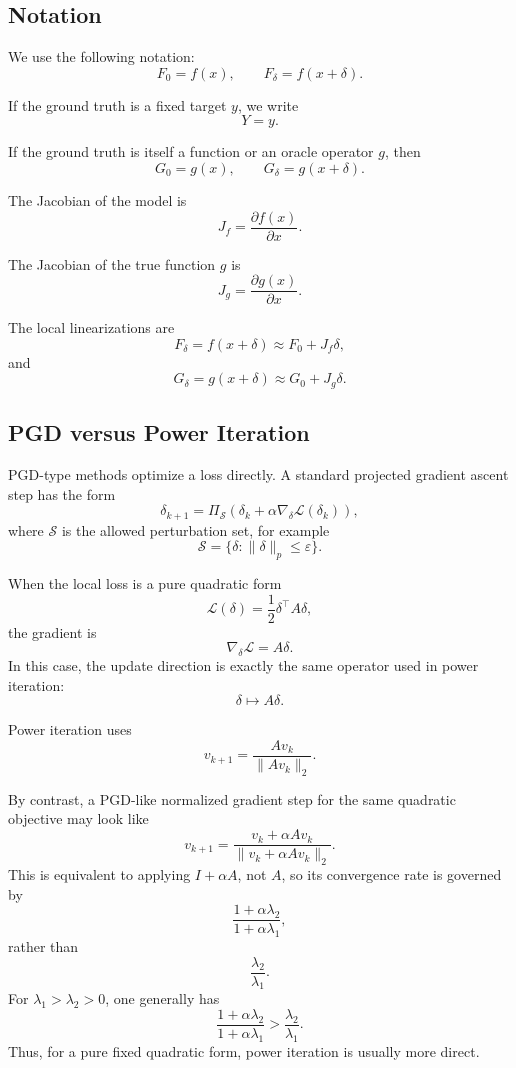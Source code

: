 \documentclass{article}
\begin{document}
\subsection{Notation}

We use the following notation:
\[
    F_0 = f(x),
    \qquad
    F_\delta = f(x+\delta).
\]

If the ground truth is a fixed target \(y\), we write
\[
    Y = y.
\]

If the ground truth is itself a function or an oracle operator \(g\), then
\[
    G_0 = g(x),
    \qquad
    G_\delta = g(x+\delta).
\]

The Jacobian of the model is
\[
    J_f = \frac{\partial f(x)}{\partial x}.
\]

The Jacobian of the true function \(g\) is
\[
    J_g = \frac{\partial g(x)}{\partial x}.
\]

The local linearizations are
\[
    F_\delta
    =
    f(x+\delta)
    \approx
    F_0 + J_f\delta,
\]
and
\[
    G_\delta
    =
    g(x+\delta)
    \approx
    G_0 + J_g\delta.
\]

\subsection{PGD versus Power Iteration}

PGD-type methods optimize a loss directly. A standard projected gradient ascent step has the form
\[
    \delta_{k+1}
    =
    \Pi_{\mathcal{S}}
    \left(
        \delta_k + \alpha \nabla_\delta \mathcal{L}(\delta_k)
    \right),
\]
where \(\mathcal{S}\) is the allowed perturbation set, for example
\[
    \mathcal{S}
    =
    \{\delta:\|\delta\|_p\le \varepsilon\}.
\]

When the local loss is a pure quadratic form
\[
    \mathcal{L}(\delta)
    =
    \frac{1}{2}\delta^\top A\delta,
\]
the gradient is
\[
    \nabla_\delta \mathcal{L}
    =
    A\delta.
\]
In this case, the update direction is exactly the same operator used in power iteration:
\[
    \delta \mapsto A\delta.
\]

Power iteration uses
\[
    v_{k+1}
    =
    \frac{A v_k}{\|A v_k\|_2}.
\]

By contrast, a PGD-like normalized gradient step for the same quadratic objective may look like
\[
    v_{k+1}
    =
    \frac{v_k+\alpha A v_k}
    {\|v_k+\alpha A v_k\|_2}.
\]
This is equivalent to applying \(I+\alpha A\), not \(A\), so its convergence rate is governed by
\[
    \frac{1+\alpha\lambda_2}{1+\alpha\lambda_1},
\]
rather than
\[
    \frac{\lambda_2}{\lambda_1}.
\]
For \(\lambda_1>\lambda_2>0\), one generally has
\[
    \frac{1+\alpha\lambda_2}{1+\alpha\lambda_1}
    >
    \frac{\lambda_2}{\lambda_1}.
\]
Thus, for a pure fixed quadratic form, power iteration is usually more direct.
\end{document}

